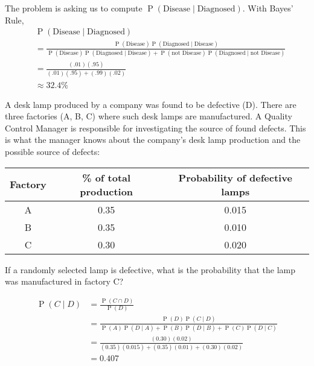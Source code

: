 \documentclass[11pt]{exam}
\DeclareMathOperator*{\Prob}{P}
\renewcommand{\Pr}{\Prob}
\begin{document}
\begin{questions}
\begin{solution}
The problem is asking us to compute $\Pr(\text{Disease}\mid \text{Diagnosed})$. With Bayes' Rule,
\begin{align*}
& \Pr(\text{Disease}\mid \text{Diagnosed}) \\
&= \frac{\Pr(\text{Disease})\Pr(\text{Diagnosed}\mid \text{Disease})}
{\Pr(\text{Disease})\Pr(\text{Diagnosed}\mid \text{Disease})
+ \Pr(\text{not Disease})\Pr(\text{Diagnosed}\mid \text{not Disease})}\\
&= \frac{(.01)(.95) }{(.01)(.95)+(.99)(.02)} \\
&\approx 32.4\%
\end{align*}
\end{solution}

\question A desk lamp produced by a company was found to be defective (D). There are three factories (A, B, C) where such desk lamps are manufactured. A Quality Control Manager is responsible for investigating the source of found defects. This is what the manager knows about the company's desk lamp production and the possible source of defects: 

\begin{center}
\begin{tabular}{|c|c|c|} \hline
Factory & \% of total production & Probability of defective lamps \\ \hline
A &  0.35 & 0.015 \\ \hline
B &  0.35 & 0.010 \\ \hline
C &  0.30 & 0.020\\ \hline
\end{tabular}
\end{center}

If a randomly selected lamp is defective, what is the probability that the lamp was manufactured in factory C?
\begin{solution}
\begin{align*}
\Pr(C \mid D) & = \frac{\Pr(C \cap D)}{\Pr(D)} \\
& = \frac{\Pr(D)\Pr(C \mid D)}
{\Pr(A)\Pr(D\mid A) + \Pr(B)\Pr(D\mid B) + \Pr(C)\Pr(D \mid C)}\\
&= \frac{(0.30)(0.02)}{(0.35)(0.015)+(0.35)(0.01)+(0.30)(0.02)} \\
&= 0.407
\end{align*}
\end{solution}


\newpage
{}


\end{questions}
\end{document}

